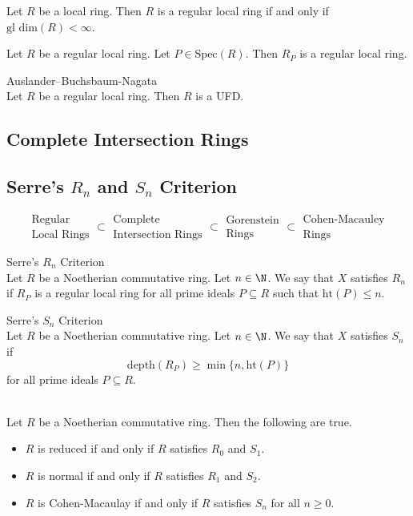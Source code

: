 \documentclass[a4paper]{article}
\begin{document}
\begin{prp}{}{} Let $R$ be a local ring. Then $R$ is a regular local ring if and only if $\text{gl dim}(R)<\infty$. 
\end{prp}

\begin{crl}{}{} Let $R$ be a regular local ring. Let $P\in\text{Spec}(R)$. Then $R_P$ is a regular local ring. 
\end{crl}

\begin{thm}{Auslander–Buchsbaum-Nagata}{}\\
Let $R$ be a regular local ring. Then $R$ is a UFD. 
\end{thm}

\subsection{Complete Intersection Rings}

\subsection{Serre's $R_n$ and $S_n$ Criterion}

$$\substack{\text{Regular}\\\text{Local Rings}}\subset\substack{\text{Complete}\\\text{Intersection Rings}}\subset\substack{\text{Gorenstein}\\\text{Rings}}\subset\substack{\text{Cohen-Macauley}\\\text{Rings}}$$

\begin{defn}{Serre's $R_n$ Criterion}{}\\
Let $R$ be a Noetherian commutative ring. Let $n\in\N$. We say that $X$ satisfies $R_n$ if $R_P$ is a regular local ring for all prime ideals $P\subseteq R$ such that $\text{ht}(P)\leq n$. 
\end{defn}

\begin{defn}{Serre's $S_n$ Criterion}{}\\
Let $R$ be a Noetherian commutative ring. Let $n\in\N$. We say that $X$ satisfies $S_n$ if $$\text{depth}(R_P)\geq\min\{n,\text{ht}(P)\}$$ for all prime ideals $P\subseteq R$. 
\end{defn}

\begin{prp}{}{}\\
Let $R$ be a Noetherian commutative ring. Then the following are true. 
\begin{itemize}
\item $R$ is reduced if and only if $R$ satisfies $R_0$ and $S_1$. 
\item $R$ is normal if and only if $R$ satisfies $R_1$ and $S_2$. 
\item $R$ is Cohen-Macaulay if and only if $R$ satisfies $S_n$ for all $n\geq 0$. 
\end{itemize}
\end{prp}
\end{document}
